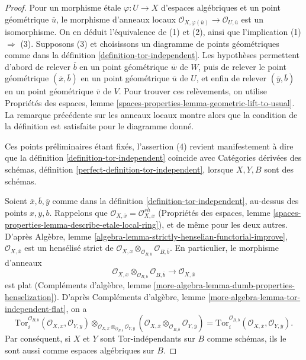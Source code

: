 \begin{proof}
Pour un morphisme \'etale $\varphi:U\to X$ d'espaces alg\'ebriques et un point
g\'eom\'etrique $\overline u$, le morphisme d'anneaux locaux
$\mathcal{O}_{X,\varphi(\overline u)}\to\mathcal{O}_{U,\overline u}$ est un
isomorphisme. On en d\'eduit l'\'equivalence de (1) et (2), ainsi que
l'implication (1) $\Rightarrow$ (3). Supposons (3) et choisissons un diagramme
de points g\'eom\'etriques comme dans la d\'efinition
\ref{definition-tor-independent}. Les hypoth\`eses permettent d'abord de
relever $\overline b$ en un point g\'eom\'etrique $\overline w$ de $W$, puis de
relever le point g\'eom\'etrique $(\overline x,\overline b)$ en un point
g\'eom\'etrique $\overline u$ de $U$, et enfin de relever
$(\overline y,\overline b)$ en un point g\'eom\'etrique $\overline v$ de $V$.
Pour trouver ces rel\`evements, on utilise Propri\'et\'es des espaces, lemme
\ref{spaces-properties-lemma-geometric-lift-to-usual}. La remarque pr\'ec\'edente
sur les anneaux locaux montre alors que la condition de la d\'efinition est
satisfaite pour le diagramme donn\'e.

\medskip\noindent
Ces points pr\'eliminaires \'etant fix\'es, l'assertion (4) revient 
manifestement \`a dire que la d\'efinition \ref{definition-tor-independent}
co\"incide avec Cat\'egories d\'eriv\'ees des sch\'emas, d\'efinition
\ref{perfect-definition-tor-independent}, lorsque $X,Y,B$ sont des sch\'emas.

\medskip\noindent
Soient $\overline x,\overline b,\overline y$ comme dans la d\'efinition
\ref{definition-tor-independent}, au-dessus des points $x,y,b$. Rappelons que
$\mathcal{O}_{X,\overline{x}}=\mathcal{O}_{X,x}^{sh}$ (Propri\'et\'es des
espaces, lemme \ref{spaces-properties-lemma-describe-etale-local-ring}), et de
m\^eme pour les deux autres. D'apr\`es Alg\`ebre, lemme
\ref{algebra-lemma-strictly-henselian-functorial-improve},
$\mathcal{O}_{X,\overline x}$ est un hens\'elis\'e strict de
$\mathcal{O}_{X,x}\otimes_{\mathcal{O}_{B,b}}\mathcal{O}_{B,\overline b}$.
En particulier, le morphisme d'anneaux
$$
\mathcal{O}_{X, x} \otimes_{\mathcal{O}_{B, b}} \mathcal{O}_{B, \overline{b}}
\longrightarrow
\mathcal{O}_{X, \overline{x}}
$$
est plat (Compl\'ements d'alg\`ebre, lemme
\ref{more-algebra-lemma-dumb-properties-henselization}). D'apr\`es Compl\'ements
d'alg\`ebre, lemme \ref{more-algebra-lemma-tor-independent-flat}, on a
$$
\text{Tor}_i^{\mathcal{O}_{B, b}}(\mathcal{O}_{X, x}, \mathcal{O}_{Y, y})
\otimes_{\mathcal{O}_{X, x} \otimes_{\mathcal{O}_{B, b}} \mathcal{O}_{Y, y}}
(\mathcal{O}_{X, \overline{x}} \otimes_{\mathcal{O}_{B, \overline{b}}}
\mathcal{O}_{Y, \overline y})
=
\text{Tor}_i^{\mathcal{O}_{B, \overline{b}}}(
\mathcal{O}_{X, \overline{x}}, \mathcal{O}_{Y, \overline{y}}).
$$
Par cons\'equent, si $X$ et $Y$ sont Tor-ind\'ependants sur $B$ comme
sch\'emas, ils le sont aussi comme espaces alg\'ebriques sur $B$.


\end{proof}
